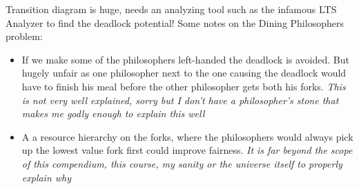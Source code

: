Transition diagram is huge, needs an analyzing tool such as the infamous LTS Analyzer to find the deadlock potential! Some notes on the Dining Philosophers problem:
\begin{itemize}
\item If we make some of the philosophers left-handed the deadlock is avoided. But hugely unfair as one philosopher next to the one causing the deadlock would have to finish his meal before the other philosopher gets both his forks. \textit{This is not very well explained, sorry but I don't have a philosopher's stone that makes me godly enough to explain this well}
\item A a resource hierarchy on the forks, where the philosophers would always pick up the lowest value fork first could improve fairness. \textit{It is far beyond the scope of this compendium, this course, my sanity or the universe itself to properly explain why}
\end{itemize}
